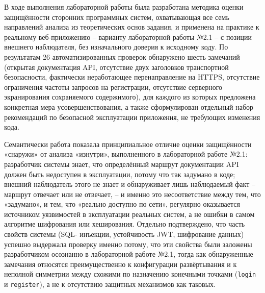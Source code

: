 \newpage
{}

В ходе выполнения лабораторной работы была разработана методика оценки
защищённости сторонних программных систем, охватывающая все семь
направлений анализа из теоретических основ задания, и применена на
практике к реальному веб-приложению -- варианту лабораторной работы
№2.1 -- с позиции внешнего наблюдателя, без изначального доверия к
исходному коду. По результатам 26 автоматизированных проверок обнаружено
шесть замечаний (открытая документация API, отсутствие двух заголовков
транспортной безопасности, фактически неработающее перенаправление на
HTTPS, отсутствие ограничения частоты запросов на регистрации,
отсутствие серверного экранирования сохраняемого содержимого), для
каждого из которых предложена конкретная мера усовершенствования, а
также сформулирован отдельный набор рекомендаций по безопасной
эксплуатации приложения, не требующих изменения кода.

Семантически работа показала принципиальное отличие оценки защищённости
«снаружи» от анализа «изнутри», выполненного в лабораторной работе №2.1:
разработчик системы знает, что определённый маршрут документации
API должен быть недоступен в эксплуатации, потому что так задумано в
коде; внешний наблюдатель этого не знает и обнаруживает лишь
наблюдаемый факт -- маршрут отвечает или не отвечает, -- и именно это
несоответствие между тем, что «задумано», и тем, что «реально доступно
по сети», регулярно оказывается источником уязвимостей в эксплуатации
реальных систем, а не ошибки в самом алгоритме шифрования или
хеширования. Отдельно подтверждено, что часть свойств системы (SQL-
инъекции, устойчивость JWT, шифрование данных) успешно выдержала
проверку именно потому, что эти свойства были заложены разработчиком
осознанно в лабораторной работе №2.1, тогда как обнаруженные замечания
относятся преимущественно к конфигурации развёртывания и к
неполной симметрии между схожими по назначению конечными точками
(\texttt{login} и \texttt{register}), а не к отсутствию защитных
механизмов как таковых.

